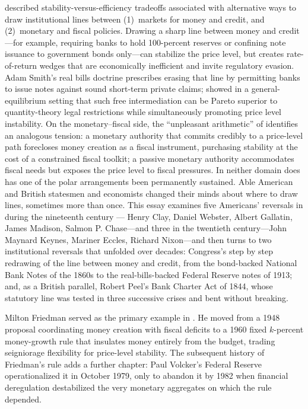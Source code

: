 \documentclass[12pt]{article}
\begin{document}
\citet{Sargent2011} described stability-versus-efficiency tradeoffs associated with alternative 
ways  to draw institutional lines between
(1)~markets for money and credit, and (2)~monetary and fiscal policies.
 Drawing a sharp line between money
and credit---for example, requiring banks to hold 100-percent reserves or
confining note issuance to government bonds only---can stabilize the price
level, but creates rate-of-return wedges that are economically inefficient
and invite regulatory evasion.  Adam Smith's real bills doctrine
prescribes erasing that line by permitting banks to issue notes
against sound short-term private claims; \citet{SargentWallace1982} showed
in a general-equilibrium setting that such free intermediation can be Pareto
superior to quantity-theory legal restrictions while simultaneously promoting price level instability.
  On the monetary--fiscal side, the ``unpleasant arithmetic''
of \citet{SargentWallace1981} identifies an analogous tension: a monetary
authority that commits credibly to a price-level path forecloses money
creation as a fiscal instrument, purchasing stability at the cost of a
constrained fiscal toolkit; a passive monetary authority accommodates
fiscal needs but exposes the price level to fiscal pressures.  In neither
domain does has one of the polar arrangements been permanently sustained.  Able American and British  statesmen
and economists  changed their minds about where to draw lines,
sometimes more than once.  This essay examines five
Americans'  reversals in during the nineteenth century --- Henry Clay, Daniel Webster,
Albert Gallatin, James Madison, Salmon P. Chase---and three in the twentieth century---John Maynard Keynes, Mariner Eccles, Richard Nixon---and then turns to two
institutional reversals that unfolded over decades: Congress's step by step
redrawing of the line between money and credit, from the bond-backed
National Bank Notes of the 1860s to the real-bills-backed Federal
Reserve notes of 1913; and, as a British parallel, Robert Peel's Bank
Charter Act of 1844, whose statutory line was tested in three successive
crises and bent without breaking.

Milton Friedman served as the primary example in \citet{Sargent2011}. He
moved from a 1948 proposal coordinating money creation with fiscal
deficits to a 1960 fixed $k$-percent money-growth rule that insulates money
entirely from the budget, trading seigniorage flexibility for price-level
stability.  The subsequent history of Friedman's
rule adds a further chapter: Paul Volcker's Federal Reserve
operationalized it in October 1979, only to abandon it by 1982 when
financial deregulation destabilized the very monetary aggregates on
which the rule depended.
\end{document}
